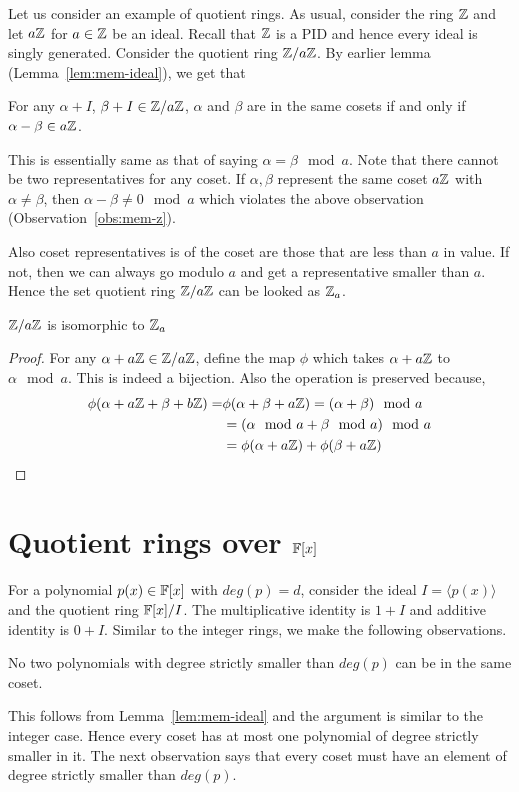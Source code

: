 Let us consider an example of quotient rings. As usual, consider the ring ${\mathbb{Z}}$
and let $a{\mathbb{Z}}$ for $a \in {\mathbb{Z}}$ be an ideal. Recall that ${\mathbb{Z}}$ is a PID and hence
every ideal is singly generated. Consider the quotient ring ${\mathbb{Z}}/a{\mathbb{Z}}$. 
By earlier lemma (Lemma~\ref{lem:mem-ideal}), we get that 
\begin{observation} \label{obs:mem-z}
	For any $\alpha + I$, $\beta + I \in {\mathbb{Z}}/a{\mathbb{Z}}$, $\alpha$ and $\beta$
	are in the same cosets if and only if $\alpha - \beta \in a{\mathbb{Z}}$. 
\end{observation}
This is essentially same as that of saying $\alpha = \beta \mod a$. 
Note that there cannot be two representatives for any coset. If $\alpha,
\beta$ represent the same coset $a{\mathbb{Z}}$ with $\alpha \ne \beta$, then
$\alpha-\beta \ne 0 \mod a$ which violates the above observation
(Observation~\ref{obs:mem-z}).

Also coset representatives is of the coset are those that are less than
$a$ in value. If not, then we can always go modulo $a$ and get a
representative smaller than $a$. Hence the set quotient ring ${\mathbb{Z}}/a{\mathbb{Z}}$ can be
looked as ${\mathbb{Z}}_a$.
\begin{claim}
	${\mathbb{Z}}/a{\mathbb{Z}}$ is isomorphic to ${\mathbb{Z}}_a$
\end{claim}
\begin{proof}
	For any $\alpha + a{\mathbb{Z}} \in {\mathbb{Z}}/a{\mathbb{Z}}$, define the map $\phi$ which takes
	$\alpha + a{\mathbb{Z}}$ to $\alpha \mod a$. This is indeed a bijection.  
	Also the operation is preserved because,
	\begin{align*}
		\phi(\alpha + a{\mathbb{Z}} + \beta +b{\mathbb{Z}}) = & \phi(\alpha + \beta +a{\mathbb{Z}})
		= (\alpha + \beta) \mod a \\ 
		& = (\alpha \mod a + \beta \mod a ) \mod a \\
		& = \phi(\alpha + a{\mathbb{Z}}) + \phi(\beta +a{\mathbb{Z}})
	\end{align*}
\end{proof}

\section{Quotient rings over ${\mathbb{F}}[x]$}
For a polynomial $p(x) \in {\mathbb{F}}[x]$ with $deg(p) = d$, consider the ideal $I =
\langle p(x) \rangle$ and the quotient ring ${\mathbb{F}}[x]/I$. The multiplicative 
identity is $1 + I$ and additive identity is $0 + I$.  Similar to the integer
rings, we make the following observations.

\begin{observation}
	No two polynomials with degree strictly smaller than $deg(p)$ can be
	in the same coset. 
\end{observation}
This follows from Lemma~\ref{lem:mem-ideal} and the argument is similar to the
integer case. Hence every coset has at most one polynomial of degree strictly
smaller in it. The next observation says that every coset must have an element
of degree strictly smaller than $deg(p)$.

